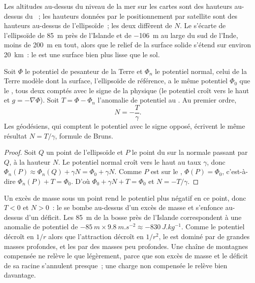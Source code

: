 Les altitudes au-dessus du niveau de la mer sur les cartes sont des hauteurs
au-dessus du ~; les hauteurs données par le positionnement par satellite sont
des hauteurs au-dessus de l'ellipsoïde~; les deux diffèrent de
$N$. Le  s'écarte de l'ellipsoïde de \qty{+85}{m} près de l'Islande et de
\qty{-106}{m} au large du sud de l'Inde, moins de \qty{200}{m} en tout, alors que
le relief de la surface solide s'étend sur environ \qty{20}{km}~: le  est une
surface bien plus lisse que le sol.

\begin{proposition}\label{prop:b1:isostasy-gravity:bruns}
Soit $\Phi$ le potentiel de pesanteur de la Terre et $\Phi_n$ le potentiel normal,
celui de la Terre modèle dont la surface, l'ellipsoïde de référence, a le même
potentiel $\Phi_0$ que le , tous deux comptés avec le signe de la physique (le
potentiel croît vers le haut et $g = -\nabla\Phi$). Soit $T = \Phi - \Phi_n$ l'anomalie de
potentiel au . Au premier ordre,
\[
  N = -\frac{T}{\gamma} .
\]
Les géodésiens, qui comptent le potentiel avec le signe opposé, écrivent le même
résultat $N = T/\gamma$, formule de Bruns.
\end{proposition}

\begin{proof}
Soit $Q$ un point de l'ellipsoïde et $P$ le point du  sur la
normale passant par $Q$, à la hauteur $N$. Le potentiel normal croît vers le haut
au taux $\gamma$, donc $\Phi_n(P) \approx \Phi_n(Q) + \gamma N = \Phi_0 +
\gamma N$. Comme $P$ est sur le , $\Phi(P) = \Phi_0$, c'est-à-dire
$\Phi_n(P) + T = \Phi_0$. D'où $\Phi_0 + \gamma N + T = \Phi_0$ et $N =
-T/\gamma$.
\end{proof}

Un excès de masse sous un point rend le potentiel plus négatif en ce point, donc
$T < 0$ et $N > 0$~: le  se bombe au-dessus d'un excès de masse et s'enfonce au-dessus
d'un déficit. Les \qty{85}{m} de la bosse près de l'Islande correspondent à une
anomalie de potentiel de $-\qty{85}{m}\times\qty{9.8}{m.s^{-2}} \approx \qty{-830}{J.kg^{-1}}$.
Comme le potentiel décroît en $1/r$ alors que l'attraction décroît en $1/r^2$,
le  est dominé par de grandes masses profondes, et les 
par des masses peu profondes. Une chaîne de montagnes compensée ne relève le 
que légèrement, parce que son excès de masse et le déficit de sa racine
s'annulent presque~; une charge non compensée le relève bien davantage.

